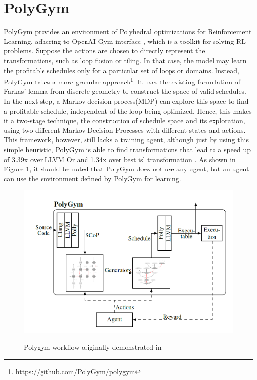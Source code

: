 \documentclass[logo,msc]{infthesis}           %
\begin{document}
\section{PolyGym}

PolyGym provides an environment of Polyhedral optimizations for Reinforcement Learning, adhering to OpenAI Gym interface \cite{Gym}, which is a toolkit for solving RL problems. Suppose the actions are chosen to directly represent the transformations, such as loop fusion or tiling. In that case, the model may learn the profitable schedules only for a particular set of loops or domains. Instead, PolyGym takes a more granular approach\footnote{https://github.com/PolyGym/polygym}. It uses the existing formulation of Farkas' lemma from discrete geometry to construct the space of valid schedules. In the next step, a Markov decision process(MDP) can explore this space to find a profitable schedule, independent of the loop being optimized. Hence, this makes it a two-stage technique, the construction of schedule space and its exploration, using two different Markov Decision Processes with different states and actions. This framework, however, still lacks a training agent, although just by using this simple heuristic, PolyGym is able to find transformations that lead to a speed up of 3.39x over LLVM Or and 1.34x over best isl transformation \cite{P1}. As shown in Figure \ref{fig:polygym}, it should be noted that PolyGym does not use any agent, but an agent can use the environment defined by PolyGym for learning.

\begin{figure}[htbp]
  \centering
  \includegraphics[width=\textwidth]{Images/PolyGym.png}
  \label{fig:polygym}  
  \caption{Polygym workflow originally demonstrated in \cite{P1}}
\end{figure}
\end{document}
